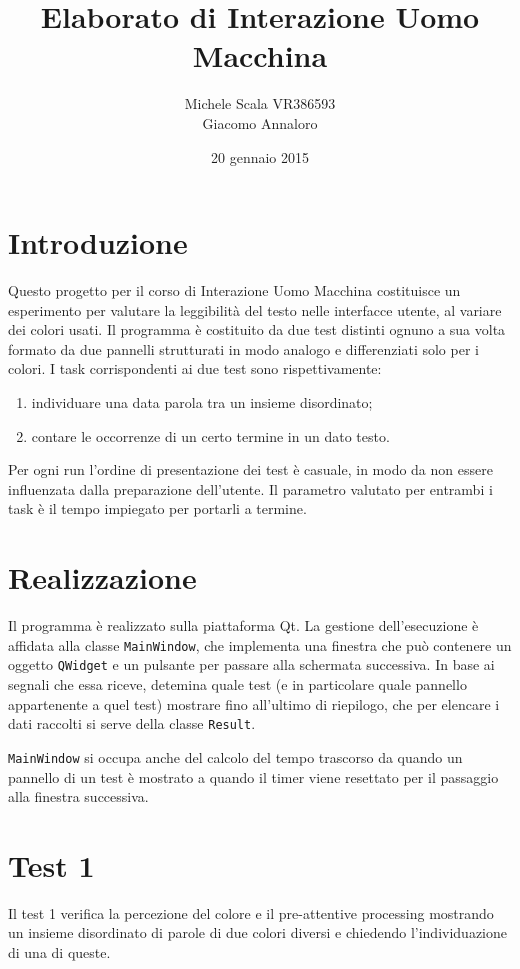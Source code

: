 \documentclass[a4paper]{article}
\begin{document}
\title{Elaborato di Interazione Uomo Macchina}
\author{Michele Scala VR386593 \\ Giacomo Annaloro}
\date{20 gennaio 2015}
\maketitle


\section{Introduzione}
Questo progetto per il corso di Interazione Uomo Macchina costituisce un esperimento per valutare la leggibilità del testo nelle interfacce utente, al variare dei colori usati. Il programma è costituito da due test distinti ognuno a sua volta formato da due pannelli strutturati in modo analogo e differenziati solo per i colori.
I task corrispondenti ai due test sono rispettivamente:
\begin{enumerate}
\item individuare una data parola tra un insieme disordinato;
\item contare le occorrenze di un certo termine in un dato testo.
\end{enumerate}
Per ogni run l'ordine di presentazione dei test è casuale, in modo da non essere influenzata dalla preparazione dell'utente. 
Il parametro valutato per entrambi i task è il tempo impiegato per portarli a termine.

\section{Realizzazione}
Il programma è realizzato sulla piattaforma Qt. 
La gestione dell'esecuzione è affidata alla classe \verb:MainWindow:, che implementa una finestra che può contenere un oggetto \verb:QWidget: e un pulsante per passare alla schermata successiva. In base ai segnali che essa riceve, detemina quale test (e in particolare quale pannello appartenente a quel test) mostrare fino all'ultimo di riepilogo, che per elencare i dati raccolti si serve della classe \verb:Result:.

\verb:MainWindow: si occupa anche del calcolo del tempo trascorso da quando un pannello di un test è mostrato a quando il timer viene resettato per il passaggio alla finestra successiva.

\pagebreak

\section{Test 1}
Il test 1 verifica la percezione del colore e il pre-attentive processing mostrando un insieme disordinato di parole di due colori diversi e chiedendo l'individuazione di una di queste.
\end{document}
